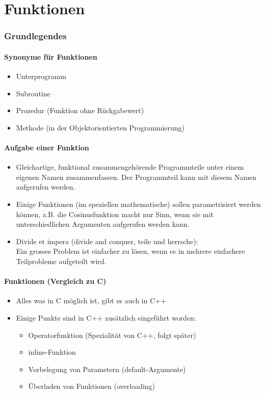 
\part{Funktionen}

\section{Grundlegendes}

\subsection{Synonyme für Funktionen}
\begin{itemize}
	\item Unterprogramm
	\item Subroutine
	\item Prozedur (Funktion ohne Rückgabewert)
	\item Methode (in der Objektorientierten Programmierung)
\end{itemize}

\subsection{Aufgabe einer Funktion}
\begin{itemize}
	\item Gleichartige, funktional zusammengehörende Programmteile unter einem eigenen Namen zusammenfassen. Der Programmteil kann mit diesem Namen aufgerufen werden.
	\item Einige Funktionen (im speziellen mathematische) sollen parametrisiert werden können, z.B. die Cosinusfunktion macht nur Sinn, wenn sie mit unterschiedlichen Argumenten aufgerufen werden kann.
	\item Divide et impera (divide and conquer, teile und herrsche):\\
	Ein grosses Problem ist einfacher zu lösen, wenn es in mehrere einfachere Teilprobleme aufgeteilt wird.
\end{itemize}

\subsection{Funktionen (Vergleich zu C)}
\begin{itemize}
	\item Alles was in C möglich ist, gibt es auch in C++
	\item Einige Punkte sind in C++ zusätzlich eingeführt worden:
	\begin{itemize}
		\item Operatorfunktion (Spezialität von C++, folgt später)
		\item inline-Funktion
		\item Vorbelegung von Parametern (default-Argumente)
		\item Überladen von Funktionen (overloading)
	\end{itemize}
\end{itemize}

